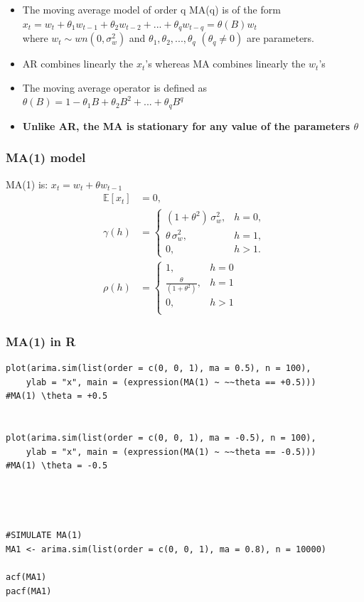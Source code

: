\documentclass{article}
\begin{document}
\begin{itemize}
    \item The moving average model of order q MA(q) is of the form \\
    $x_t = w_t + \theta_1 w_{t-1} + \theta_2 w_{t-2} + ... + \theta_q w_{t-q} = \theta(B)w_t$\\ 
    where $w_t \sim wn(0,\sigma^2_w)$ and $\theta_1, \theta_2, ..., \theta_q$ $(\theta_q \neq 0)$ are parameters.
    \item AR combines linearly the $x_t$'s whereas MA combines linearly the $w_t$'s
    \item The moving average operator is defined as $\theta(B) = 1 - \theta_1 B + \theta_2 B^2 + ... + \theta_q B^q$
    \item \textbf{Unlike AR, the MA is stationary for any value of the parameters $\theta$}
\end{itemize}

\subsubsection{MA(1) model}

MA(1) is: $x_t = w_t + \theta w_{t-1}$
\begin{align*}
\mathbb{E}[x_t] &= 0,\\
\gamma(h) &= 
  \begin{cases}
    (1+\theta^2)\,\sigma_w^2, & h=0,\\
    \theta\,\sigma_w^2,       & h=1,\\
    0,                         & h>1.
  \end{cases}\\
  \rho(h) &= \begin{cases}
      1 , & h=0\\
      \frac{\theta}{(1+\theta^2)}, & h=1\\
      0, & h>1\\
  \end{cases}
\end{align*}

\subsubsection{MA(1) in R}
\begin{lstlisting}
plot(arima.sim(list(order = c(0, 0, 1), ma = 0.5), n = 100),
    ylab = "x", main = (expression(MA(1) ~ ~~theta == +0.5)))
#MA(1) \theta = +0.5

    
plot(arima.sim(list(order = c(0, 0, 1), ma = -0.5), n = 100), 
    ylab = "x", main = (expression(MA(1) ~ ~~theta == -0.5)))
#MA(1) \theta = -0.5




#SIMULATE MA(1)
MA1 <- arima.sim(list(order = c(0, 0, 1), ma = 0.8), n = 10000)

acf(MA1)
pacf(MA1)
\end{lstlisting}
\end{document}
